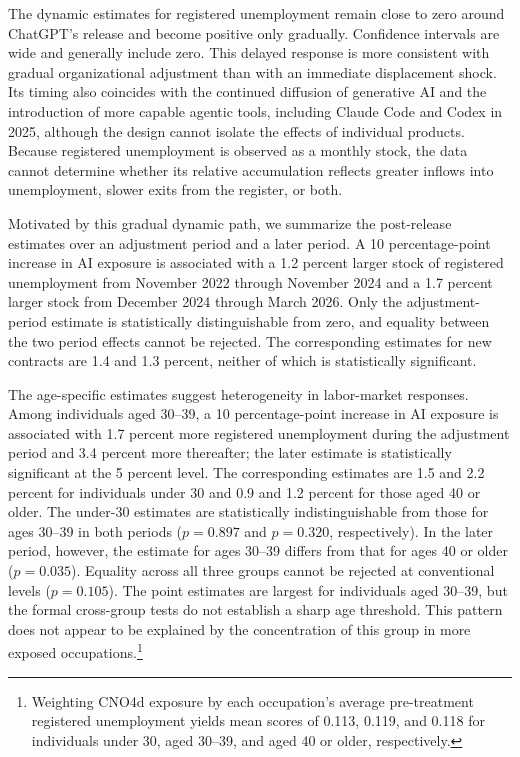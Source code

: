 \documentclass[11pt]{article}
\begin{document}
The dynamic estimates for registered unemployment remain close to zero around ChatGPT's release and become positive only gradually. Confidence intervals are wide and generally include zero. This delayed response is more consistent with gradual organizational adjustment than with an immediate displacement shock. Its timing also coincides with the continued diffusion of generative AI and the introduction of more capable agentic tools, including Claude Code and Codex in 2025, although the design cannot isolate the effects of individual products. Because registered unemployment is observed as a monthly stock, the data cannot determine whether its relative accumulation reflects greater inflows into unemployment, slower exits from the register, or both.

Motivated by this gradual dynamic path, we summarize the post-release estimates over an adjustment period and a later period. A 10 percentage-point increase in AI exposure is associated with a 1.2 percent larger stock of registered unemployment from November 2022 through November 2024 and a 1.7 percent larger stock from December 2024 through March 2026. Only the adjustment-period estimate is statistically distinguishable from zero, and equality between the two period effects cannot be rejected. The corresponding estimates for new contracts are 1.4 and 1.3 percent, neither of which is statistically significant.

The age-specific estimates suggest heterogeneity in labor-market responses. Among individuals aged 30--39, a 10 percentage-point increase in AI exposure is associated with 1.7 percent more registered unemployment during the adjustment period and 3.4 percent more thereafter; the later estimate is statistically significant at the 5 percent level. The corresponding estimates are 1.5 and 2.2 percent for individuals under 30 and 0.9 and 1.2 percent for those aged 40 or older. The under-30 estimates are statistically indistinguishable from those for ages 30--39 in both periods (\(p=0.897\) and \(p=0.320\), respectively). In the later period, however, the estimate for ages 30--39 differs from that for ages 40 or older (\(p=0.035\)). Equality across all three groups cannot be rejected at conventional levels (\(p=0.105\)). The point estimates are largest for individuals aged 30–39, but the formal cross-group tests do not establish a sharp age threshold. This pattern does not appear to be explained by the concentration of this group in more exposed occupations.\footnote{Weighting CNO4d exposure by each occupation's average pre-treatment registered unemployment yields mean scores of 0.113, 0.119, and 0.118 for individuals under 30, aged 30--39, and aged 40 or older, respectively.}
\end{document}
